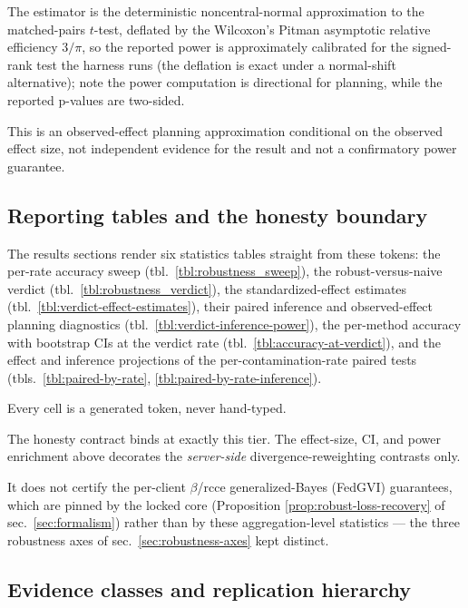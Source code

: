 \documentclass[
  english,
]{article}
\theoremstyle{plain}
\theoremstyle{definition}
\theoremstyle{remark}
\theoremstyle{definition}
\begin{document}
The estimator is the deterministic noncentral-normal approximation to
the matched-pairs \(t\)-test, deflated by the Wilcoxon's Pitman
asymptotic relative efficiency \(3/\pi\), so the reported power is
approximately calibrated for the signed-rank test the harness runs (the
deflation is exact under a normal-shift alternative); note the power
computation is directional for planning, while the reported p-values are
two-sided.

This is an observed-effect planning approximation conditional on the
observed effect size, not independent evidence for the result and not a
confirmatory power guarantee.

\subsection{Reporting tables and the honesty
boundary}\label{sec:methods-reporting}

The results sections render six statistics tables straight from these
tokens: the per-rate accuracy sweep (tbl.~\ref{tbl:robustness_sweep}),
the robust-versus-naive verdict (tbl.~\ref{tbl:robustness_verdict}), the
standardized-effect estimates (tbl.~\ref{tbl:verdict-effect-estimates}),
their paired inference and observed-effect planning diagnostics
(tbl.~\ref{tbl:verdict-inference-power}), the per-method accuracy with
bootstrap CIs at the verdict rate (tbl.~\ref{tbl:accuracy-at-verdict}),
and the effect and inference projections of the per-contamination-rate
paired tests
(tbls.~\ref{tbl:paired-by-rate}, \ref{tbl:paired-by-rate-inference}).

Every cell is a generated token, never hand-typed.

The honesty contract binds at exactly this tier. The effect-size, CI,
and power enrichment above decorates the \emph{server-side}
 divergence-reweighting contrasts only.

It does not certify the per-client \(\beta\)/rcce generalized-Bayes
(FedGVI) guarantees, which are pinned by the locked core (Proposition
\ref{prop:robust-loss-recovery} of sec.~\ref{sec:formalism}) rather than
by these aggregation-level statistics --- the three robustness axes of
sec.~\ref{sec:robustness-axes} kept distinct.

\subsection{Evidence classes and replication
hierarchy}\label{sec:methods-evidence-map}
\end{document}
